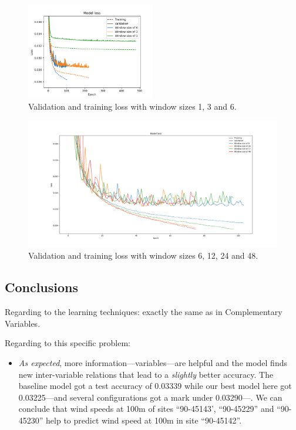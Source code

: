 \documentclass[]{article}
\begin{document}
	\begin{figure}[H]
		\centering
		\includegraphics[width=0.5\textwidth]{sites_4_1}
		\caption{Validation and training loss with window sizes 1, 3 and 6.}
		\label{f:sites_4_1}
	\end{figure}
	
	\begin{figure}[H]
		\centering
		\includegraphics[width=\textwidth]{sites_4_2}
		\caption{Validation and training loss with window sizes 6, 12, 24 and 48.}
		\label{f:sites_4_2}
	\end{figure}
	
	\subsection{Conclusions}
	
	Regarding to the learning techniques: exactly the same as in Complementary Variables.
	
	Regarding to this specific problem:
	
	\begin{itemize}
		\item \emph{As expected}, more information---variables---are helpful and the model finds new inter-variable relations that lead to a \emph{slightly} better accuracy. The baseline model got a test accuracy of 0.03339 while our best model here got 0.03225---and several configurations got a mark under 0.03290---. We can conclude that wind speeds at 100m of sites ``90-45143', ``90-45229'' and ``90-45230'' help to predict wind speed at 100m in site ``90-45142''.
	\end{itemize}
	
\end{document}
